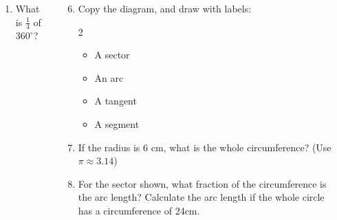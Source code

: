 \documentclass{beamer}
\newcommand{\ashow}[1]{\uncover<2->{\textcolor{red}{\small #1}}}
\begin{document}
\begin{frame}
\begin{columns}
\begin{center}
\end{center}


\small
\begin{enumerate}
  \item What is $\frac{1}{4}$ of $360^\circ$? \ashow{$90^\circ$}
\end{enumerate}

\begin{enumerate}
  \setcounter{enumi}{5}
  \item Copy the diagram, and draw with labels:
    \begin{multicols}{2}
    \begin{itemize}
      \item A sector
      \item An arc
      \item A tangent
      \item A segment
    \end{itemize}
    \end{multicols}
  \item If the radius is $6$ cm, what is the whole circumference? (Use $\pi \approx 3.14$) \ashow{$37.68$ cm}
  \item For the sector shown, what fraction of the circumference is the arc length? Calculate the arc length if the whole circle has a circumference of 24cm. \ashow{$\frac{1}{6}$; $4$ cm}

\end{enumerate}

\end{columns}
\end{frame}
\end{document}
